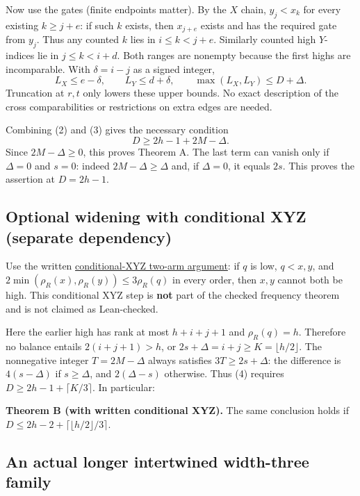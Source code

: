 \documentclass[
  11pt,
]{article}
\begin{document}
Now use the gates (finite endpoints matter). By the \(X\) chain,
\(y_j<x_k\) for every existing \(k\ge j+e\): if such \(k\) exists, then
\(x_{j+e}\) exists and has the required gate from \(y_j\). Thus any
counted \(k\) lies in \(i\le k<j+e\). Similarly counted high
\(Y\)-indices lie in \(j\le k<i+d\). Both ranges are nonempty because
the first highs are incomparable. With \(\delta=i-j\) as a signed
integer, \[
 L_X\le e-\delta,\qquad L_Y\le d+\delta,
 \qquad \max(L_X,L_Y)\le D+\Delta.                    \tag{3}
\] Truncation at \(r,t\) only lowers these upper bounds. No exact
description of the cross comparabilities or restrictions on extra edges
are needed.

Combining (2) and (3) gives the necessary condition \[
 \boxed{D\ge 2h-1+2M-\Delta.}                         \tag{4}
\] Since \(2M-\Delta\ge0\), this proves Theorem A. The last term can
vanish only if \(\Delta=0\) and \(s=0\): indeed \(2M-\Delta\ge\Delta\)
and, if \(\Delta=0\), it equals \(2s\). This proves the assertion at
\(D=2h-1\).

\subsection{Optional widening with conditional XYZ (separate
dependency)}\label{optional-widening-with-conditional-xyz-separate-dependency}

Use the written
\href{https://github.com/Aafimalek/novel-discoveries/tree/6add80bc727aef16d920be7ce39d8312fed99a87/width-three-posets/verification/conditional-xyz-two-arm-slack}{conditional-XYZ
two-arm argument}: if \(q\) is low, \(q<x,y\), and
\(2\min(\rho_R(x),\rho_R(y))\le 3\rho_R(q)\) in every order, then
\(x,y\) cannot both be high. This conditional XYZ step is \textbf{not}
part of the checked frequency theorem and is not claimed as
Lean-checked.

Here the earlier high has rank at most \(h+i+j+1\) and \(\rho_R(q)=h\).
Therefore no balance entails \(2(i+j+1)>h\), or
\(2s+\Delta=i+j\ge K=\lfloor h/2\rfloor\). The nonnegative integer
\(T=2M-\Delta\) always satisfies \(3T\ge2s+\Delta\): the difference is
\(4(s-\Delta)\) if \(s\ge\Delta\), and \(2(\Delta-s)\) otherwise. Thus
(4) requires \(D\ge2h-1+\lceil K/3\rceil\). In particular:

\textbf{Theorem B (with written conditional XYZ).} The same conclusion
holds if \(D\le2h-2+\lceil\lfloor h/2\rfloor/3\rceil\).

\subsection{An actual longer intertwined width-three
family}\label{an-actual-longer-intertwined-width-three-family}
\end{document}
